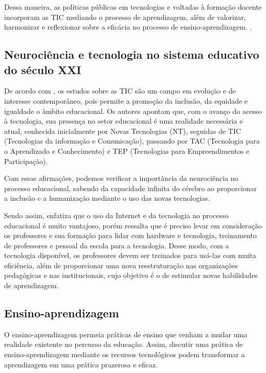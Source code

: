 \documentclass[portuguese]{textolivre}
\begin{document}
Dessa maneira, as políticas públicas em tecnologias e voltadas à formação docente incorporam as TIC mediando o processo de aprendizagem, além de valorizar, harmonizar e reflexionar sobre a eficácia no processo de ensino-aprendizagem. \cite[p. 19]{lima_do_nascimento_formacion_2020}. 


\subsection{Neurociência e tecnologia no sistema educativo do século XXI}\label{sec-formato}
De acordo com \textcite[p. 499]{fernandez_batanero_capacitacion_2019}, os estudos sobre as TIC  são um campo em evolução e de interesse contemporâneo, pois permite a promoção da inclusão, da equidade e igualdade o âmbito educacional. Os autores apontam que, com o avanço do acesso à tecnologia, sua presença no setor educacional é uma realidade necessária e atual, conhecida inicialmente por Novas Tecnologias (NT), seguidas de TIC (Tecnologias da informação e Comunicação), passando por TAC (Tecnologia para o Aprendizado e Conhecimento) e TEP (Tecnologias para Empreendimentos e Participação). 

Com essas afirmações, podemos verificar a importância da neurociência no processo educacional, sabendo da capacidade infinita do cérebro ao proporcionar a inclusão e a humanização mediante o uso das novas tecnologias.

Sendo assim, \textcite{castells_galaxia_2003} enfatiza que o uso da Internet e da tecnologia no processo educacional é muito vantajoso, porém ressalta que é preciso levar em consideração os professores e sua formação para lidar com hardware e tecnologia, treinamento de professores e pessoal da escola para a tecnologia. Desse modo, com a tecnologia disponível, os professores devem ser treinados para usá-las com muita eficiência, além de proporcionar uma nova reestruturação nas organizações pedagógicas e nas institucionais, cujo objetivo é o de estimular novas habilidades de aprendizagem.

\subsection{Ensino-aprendizagem}\label{sec-modelo}

O ensino-aprendizagem permeia práticas de ensino que venham a mudar uma realidade existente no percurso da educação. Assim, discutir uma prática de ensino-aprendizagem mediante os recursos tecnológicos podem transformar a aprendizagem em uma prática prazerosa e eficaz.
\end{document}
